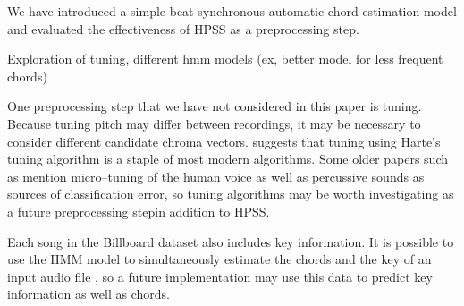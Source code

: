 \documentclass{article}
\begin{document}
We have introduced a simple beat-synchronous automatic chord estimation model
and evaluated the effectiveness of HPSS as a preprocessing step.

Exploration of tuning, different hmm models (ex, better model for less frequent chords)

One preprocessing step that we have not considered in this paper is tuning.
Because tuning pitch may differ between recordings, it may be necessary to
consider different candidate chroma vectors.  \cite{McVicar:00} suggests that
tuning using Harte's tuning algorithm is a staple of most modern algorithms.
Some older papers such as \cite{Zenz:20} mention micro--tuning of the human
voice as well as percussive sounds as sources of classification error, so
tuning algorithms may be worth investigating as a future preprocessing stepin
addition to HPSS.

Each song in the Billboard dataset also includes key information. It is
possible to use the HMM model to simultaneously estimate the chords and the key
of an input audio file \cite{McVicar:00}, so a future implementation may use
this data to predict key information as well as chords.
\end{document}
